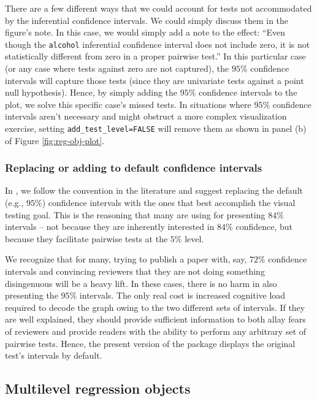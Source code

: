 There are a few different ways that we could account for tests not accommodated by the inferential confidence intervals. We could simply discuss them in the figure's note. In this case, we would simply add a note to the effect: ``Even though the \texttt{alcohol} inferential confidence interval does not include zero, it is not statistically different from zero in a proper pairwise test.'' In this particular case (or any case where tests against zero are not captured), the \(95\%\) confidence intervals will capture those tests (since they are univariate tests against a point null hypothesis). Hence, by simply adding the \(95\%\) confidence intervals to the plot, we solve this specific case's missed tests. In situations where \(95\%\) confidence intervals aren't necessary and might obstruct a more complex visualization exercise, setting \texttt{add\_test\_level=FALSE} will remove them as shown in panel (b) of Figure \ref{fig:reg-obj-plot}.

\subsubsection{Replacing or adding to default confidence intervals}\label{replacing-or-adding-to-default-confidence-intervals}

In \citet{armstrong_2025}, we follow the convention in the literature and suggest replacing the default (e.g., \(95\%\)) confidence intervals with the ones that best accomplish the visual testing goal. This is the reasoning that many are using for presenting \(84\%\) intervals -- not because they are inherently interested in \(84\%\) confidence, but because they facilitate pairwise tests at the \(5\%\) level.

We recognize that for many, trying to publish a paper with, say, \(72\%\) confidence intervals and convincing reviewers that they are not doing something disingenuous will be a heavy lift. In these cases, there is no harm in also presenting the \(95\%\) intervals. The only real cost is increased cognitive load required to decode the graph owing to the two different sets of intervals. If they are well explained, they should provide sufficient information to both allay fears of reviewers and provide readers with the ability to perform any arbitrary set of pairwise tests. Hence, the present version of the package displays the original test's intervals by default.

\subsection{Multilevel regression objects}\label{multilevel-regression-objects}

